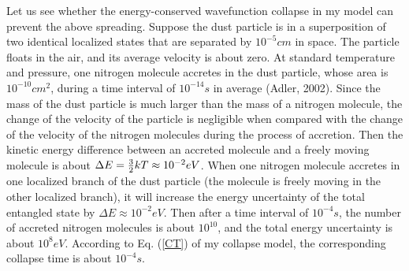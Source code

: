 Let us see whether the energy-conserved wavefunction collapse in my model can prevent the above spreading. Suppose the dust particle is in a superposition of two identical localized states that are separated by $10^{-5}cm$ in space. The particle floats in the air, and its average velocity is about zero. At standard temperature and pressure, one nitrogen molecule accretes in the dust particle, whose area is $10^{-10}cm^2$, during a time interval of $10^{-14}s$ in average (Adler, 2002). Since the mass of the dust particle is much larger than the mass of a nitrogen molecule, the change of the velocity of the particle is negligible when compared with the change of the velocity of the nitrogen molecules during the process of accretion. Then the kinetic energy difference between an accreted molecule and a freely moving molecule is about $\Delta E = {3 \over 2}kT \approx 10^{-2}eV$. When one nitrogen molecule accretes in one localized branch of the dust particle (the molecule is freely moving in the other localized branch), it will increase the energy uncertainty of the total entangled state by $\Delta E \approx 10^{-2}eV$. Then after a time interval of $10^{-4}s$, the number of accreted nitrogen molecules is about $10^{10}$, and the total energy uncertainty is about $10^{8}eV$. According to Eq. (\ref{CT}) of my collapse model, the corresponding collapse time is about $10^{-4}s$. 

